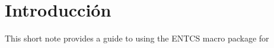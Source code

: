 \section{Introducción}\label{intro}
This short note provides a guide to using the ENTCS macro package for \cite{MichaelG.Paciello2000}